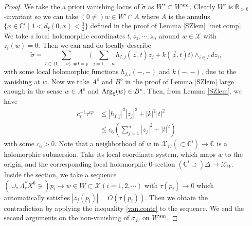 \documentclass[12pt,a4paper]{amsart}
\theoremstyle{remark}
\theoremstyle{definition}
\def\R{\mathbb{R}}
\def\C{\mathbb{C}}
\def\X{\mathcal{X}}
\begin{document}
\begin{proof}
We take the a 
priori vanishing locus of $\tilde{\sigma}$ as 
$W'\subset W^{\rm sm}$. 
Clearly $W'$ is $\R_{>0}$-invariant so 
we can take  $(0\neq) w\in W'\cap A$ where $A$ is the 
annulus 
$\{x\in \C^l\mid 1<d_\xi(0,x)<\frac{3}{2}\}$ 
defined in the proof of Lemma \ref{SZlem} \eqref{met.comp}. 
We take a local holomorphic coordinates 
$t, z_1,\cdots,z_n$ around $w\in \X$ with $z_i(w)=0$. 
Then we can and do locally describe 
$$\tilde{\sigma}=\sum_{I\subset \{1,\cdots,n\}, \#I=p}
\bigl(\sum_{j=1,\cdots,n}h_{I,j}(\vec{z},t)z_j+k(\vec{z},t)t\bigr) \wedge_{i\in I} dz_i,$$ 
with some local holomorphic functions 
$h_{I,i}(-,-)$ and $k(-,-)$, due to the vanishing at $w$. 
Now we 
take $A^o$ and $B^o$ in 
the proof of Lemma \ref{SZlem} 
large enough in the sense $w\in A^o$ and ${\rm 
Arg}_\xi(w)\in B^o$. 
Then, from Lemma \ref{SZlem}, we have 
\begin{align}\label{van.contr}
c_{\epsilon}^{-1}\tau^{\epsilon p}
&\le |h_{I,j}|^2 |z_j|^2+|k|^2 |t|^2\\ 
&\le c_6(\sum_{j=1}^n |z_j|^2+|t|^2) 
\end{align}
with some $c_6>0$. 
Note that 
a neighborhood of $w$ in $\X_W(\subset \C^l)\to \mathbb{C}$ is 
a holomorphic submersion. Take its local coordinate system, which
maps $w$ to the origin, and the
corresponding local holomorphic $0$-section $(\C^l \supset)\Delta\to \X_W$. 
Inside the section, we take a sequence $(\cup_\tau \Lambda_\tau^* X^0\ni)p_i\to w\in W\subset \X (i=1,2,\cdots)$ 
with $\tau(p_i)\to 0$ which automatically satisfies  $|z_j(p_i)|=O(\tau(p_i))$. 
Then we obtain the contradiction by applying the inequality \eqref{van.contr} to the sequence. 
We end the second arguments on the non-vanishing of $\sigma_W$ on $W^{\rm sm}$. 

\vspace{2mm}


\end{proof}
\end{document}

